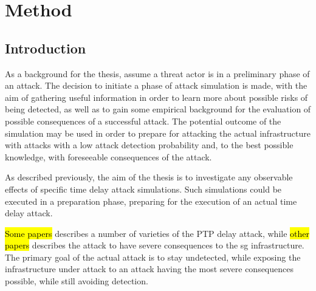 \chapter{Method} 


\section{Introduction}


As a background for the thesis, assume a threat actor is
 in a preliminary phase of an attack. The decision to initiate a phase of attack simulation is made, with the aim of gathering useful information in order to learn more about possible risks of being detected, as well as to gain some empirical background for the evaluation of possible consequences of a successful attack.
The potential outcome of the simulation may be used in order to prepare for attacking the actual infrastructure with attacks with a low attack detection probability and, to the best possible knowledge, with foreseeable consequences of the attack.

As described previously, the aim of the thesis is to investigate any observable effects of specific time delay attack simulations. Such simulations could be executed in a preparation phase, preparing for the execution of an actual time delay attack.

 \hl{Some papers} describes a number of varieties of the PTP delay attack, while \hl{other papers} describes the attack to have severe consequences to the \acrshort{sg} infrastructure. The primary goal of the actual attack is to stay undetected, while exposing the infrastructure under attack to an attack having the most severe consequences possible, while still avoiding detection.  
 








